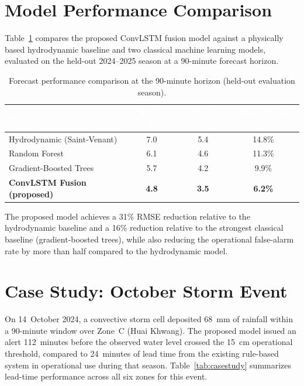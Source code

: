 \documentclass[12pt,a4paper]{report}
\begin{document}
\section{Model Performance Comparison}
Table~\ref{tab:results} compares the proposed ConvLSTM fusion model against a physically based hydrodynamic baseline and two classical machine learning models, evaluated on the held-out 2024--2025 season at a 90-minute forecast horizon.

\begin{table}[htbp]
\centering
\caption{Forecast performance comparison at the 90-minute horizon (held-out evaluation season).}
\label{tab:results}
\renewcommand{\arraystretch}{1.3}
\begin{tabular}{@{}l c c c@{}}
\toprule
\rowcolor{chulapink}
\textcolor{white}{\textbf{Model}} & \textcolor{white}{\textbf{RMSE (cm)}} & \textcolor{white}{\textbf{MAE (cm)}} & \textcolor{white}{\textbf{False-Alarm Rate}} \\
\midrule
Hydrodynamic (Saint-Venant) & 7.0 & 5.4 & 14.8\% \\
Random Forest & 6.1 & 4.6 & 11.3\% \\
Gradient-Boosted Trees & 5.7 & 4.2 & 9.9\% \\
\rowcolor{chularose}
\textbf{ConvLSTM Fusion (proposed)} & \textbf{4.8} & \textbf{3.5} & \textbf{6.2\%} \\
\bottomrule
\end{tabular}
\end{table}

\noindent
The proposed model achieves a 31\% RMSE reduction relative to the hydrodynamic baseline and a 16\% reduction relative to the strongest classical baseline (gradient-boosted trees), while also reducing the operational false-alarm rate by more than half compared to the hydrodynamic model.

\section{Case Study: October Storm Event}
On 14~October 2024, a convective storm cell deposited 68~mm of rainfall within a 90-minute window over Zone~C (Huai Khwang). The proposed model issued an alert 112~minutes before the observed water level crossed the 15~cm operational threshold, compared to 24~minutes of lead time from the existing rule-based system in operational use during that season. Table~\ref{tab:casestudy} summarizes lead-time performance across all six zones for this event.
\end{document}

